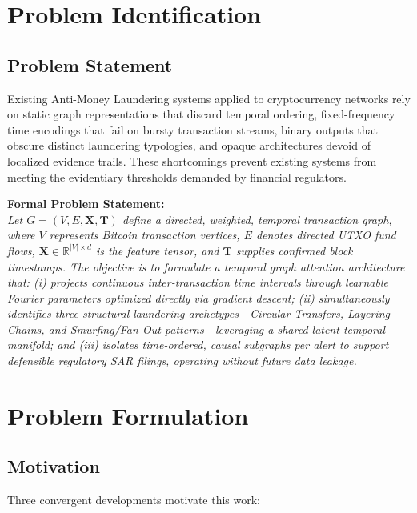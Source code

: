 \section{Problem Identification}
\label{sec:intro_problem}

\subsection{Problem Statement}
\label{subsec:problem_statement}

Existing Anti-Money Laundering systems applied to cryptocurrency networks rely on static graph representations that discard temporal ordering, fixed-frequency time encodings that fail on bursty transaction streams, binary outputs that obscure distinct laundering typologies, and opaque architectures devoid of localized evidence trails. These shortcomings prevent existing systems from meeting the evidentiary thresholds demanded by financial regulators.

\vspace{0.5em}
\noindent\textbf{Formal Problem Statement:} \\[0.5em]
\textit{Let $G = (V, E, \mathbf{X}, \mathbf{T})$ define a directed, weighted, temporal transaction graph, where $V$ represents Bitcoin transaction vertices, $E$ denotes directed UTXO fund flows, $\mathbf{X} \in \mathbb{R}^{|V| \times d}$ is the feature tensor, and $\mathbf{T}$ supplies confirmed block timestamps. The objective is to formulate a temporal graph attention architecture that: (i) projects continuous inter-transaction time intervals through learnable Fourier parameters optimized directly via gradient descent; (ii) simultaneously identifies three structural laundering archetypes—Circular Transfers, Layering Chains, and Smurfing/Fan-Out patterns—leveraging a shared latent temporal manifold; and (iii) isolates time-ordered, causal subgraphs per alert to support defensible regulatory SAR filings, operating without future data leakage.}


\section{Problem Formulation}
\label{sec:intro_formulation}

\subsection{Motivation}
\label{subsec:motivation}

Three convergent developments motivate this work:

